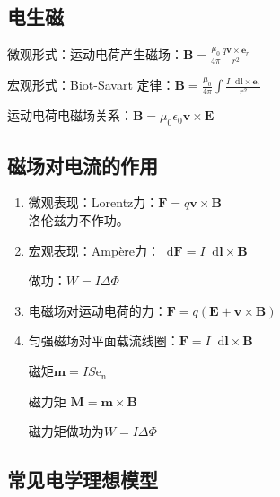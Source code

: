 \documentclass[UTF8,fontset=fandol,zihao=5]{ctexart}
\newcommand{\ee}{\mathrm{e}}
\newcommand{\vect}[1]{\bm{#1}}
\newcommand{\dif}{\mathop{}\!\mathrm{d}}
\begin{document}
\subsection{电生磁}
微观形式：运动电荷产生磁场：$\vect B=\displaystyle\frac{\mu_0}{4\pi}\frac{q\vect v\times\vect e_r}{r^2}$

宏观形式：Biot-Savart 定律：$\vect B=\displaystyle\frac{\mu_0}{4\pi}\int\frac{I\dif\vect l\times\vect e_r}{r^2}$

运动电荷电磁场关系：$ \vect B = \mu_0 \epsilon_0 \vect v \times \vect E $

\subsection{磁场对电流的作用}
\begin{enumerate}
  \item 微观表现：Lorentz力：$\vect F = q \vect v \times \vect B$
  \\ 洛伦兹力不作功。
  
  \item 宏观表现：Ampère力：$ \dif \vect F = I \dif \vect l \times \vect B$
  
  做功：$ W = I \Delta \varPhi $
  
  \item 电磁场对运动电荷的力：$\vect F = q \left (\vect E + \vect v \times \vect B \right )$
  
  \item 匀强磁场对平面载流线圈：$\vect F = I \dif \vect l \times \vect B$
  
  磁矩$ \vect m = I S \vect \ee_\mathrm{n}$
  
  磁力矩 $ \vect M = \vect m \times \vect B$

  磁力矩做功为$ W = I \Delta \varPhi $
\end{enumerate}

\subsection{常见电学理想模型}
\end{document}
